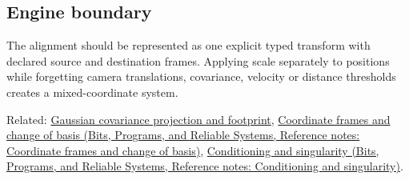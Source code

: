 \subsection{Engine boundary}\label{appendix-5f40b4fea463-engine-boundary}

The alignment should be represented as one explicit typed transform with declared source and destination frames. Applying scale separately to positions while forgetting camera translations, covariance, velocity or distance thresholds creates a mixed-coordinate system.

Related: \hyperref[appendix-24269cb6977c]{Gaussian covariance projection and footprint}, \href{../01-Bits-Programs-and-Reliable-Systems/main.pdf\#nameddest=appendix-1bae9457dbc3}{Coordinate frames and change of basis (Bits, Programs, and Reliable Systems, Reference notes: Coordinate frames and change of basis)}, \href{../01-Bits-Programs-and-Reliable-Systems/main.pdf\#nameddest=appendix-8f6a01f284a7}{Conditioning and singularity (Bits, Programs, and Reliable Systems, Reference notes: Conditioning and singularity)}.
